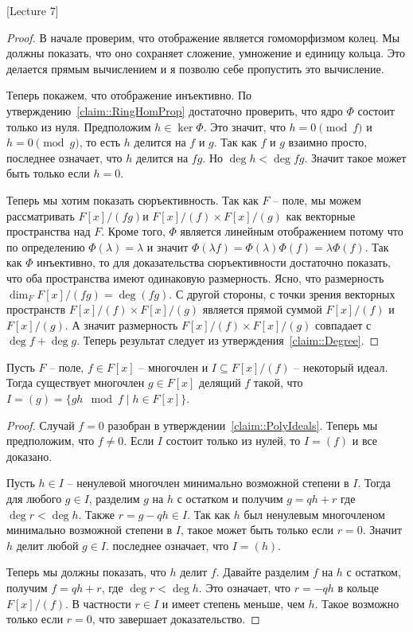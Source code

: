 [Lecture 7]


\begin{proof}
В начале проверим, что отображение является гомоморфизмом колец.
Мы должны показать, что оно сохраняет сложение, умножение и единицу кольца.
Это делается прямым вычислением и я позволю себе пропустить это вычисление.

Теперь покажем, что отображение инъективно.
По утверждению~\ref{claim::RingHomProp} достаточно проверить, что ядро $\Phi$ состоит только из нуля.
Предположим $h\in \ker \Phi$.
Это значит, что $h = 0 \pmod f$ и $h = 0 \pmod g$, то есть $h$ делится на $f$ и $g$.
Так как $f$ и $g$ взаимно просто, последнее означает, что $h$ делится на $fg$.
Но $\deg h < \deg fg$.
Значит такое может быть только если $h = 0$.

Теперь мы хотим показать сюръективность.
Так как $F$ -- поле, мы можем рассматривать $F[x]/(fg)$и $F[x]/(f)\times F[x]/(g)$ как векторные пространства над $F$.
Кроме того, $\Phi$ является линейным отображением потому что по определению $\Phi(\lambda) = \lambda$ и значит $\Phi(\lambda f) = \Phi(\lambda)\Phi(f) = \lambda \Phi(f)$.
Так как $\Phi$ инъективно, то для доказательства сюръективности достаточно показать, что оба пространства имеют одинаковую размерность.
Ясно, что размерность $\dim_F F[x]/(fg) = \deg(fg)$.
С другой стороны, с точки зрения векторных пространств $F[x]/(f)\times F[x]/(g)$ является прямой суммой $F[x]/(f)$ и $F[x]/(g)$.
А значит размерность $F[x]/(f)\times F[x]/(g)$ совпадает с $\deg f + \deg g$.
Теперь результат следует из утверждения~\ref{claim::Degree}.
\end{proof}

\begin{claim}
\label{claim::PolyRemIdeals}
Пусть $F$ -- поле, $f\in F[x]$ -- многочлен и $I\subseteq F[x]/ (f)$ -- некоторый идеал.
Тогда существует многочлен $g\in F[x]$ делящий $f$ такой, что $I = (g) = \{g h\!\!\mod{f}\mid h\in F[x]\}$.
\end{claim}
\begin{proof}
Случай $f = 0$ разобран в утверждении~\ref{claim::PolyIdeals}.
Теперь мы предположим, что $f \neq 0$.
Если $I$ состоит только из нулей, то $I = (f)$ и все доказано.

Пусть $h\in I$ -- ненулевой многочлен минимально возможной степени в $I$.
Тогда для любого $g\in I$, разделим $g$ на $h$ с остатком и получим $g = qh + r$ где $\deg r < \deg h$.
Также $r = g - qh\in I$.
Так как $h$ был ненулевым многочленом минимально возможной степени в $I$, такое может быть только если $r = 0$.
Значит $h$ делит любой $g\in I$.
последнее означает, что $I = (h)$.

Теперь мы должны показать, что $h$ делит $f$.
Давайте разделим $f$ на $h$ с остатком, получим $f = qh + r$, где $\deg r < \deg h$.
Это означает, что $r = -qh$ в кольце $F[x]/(f)$.
В частности $r\in I$ и имеет степень меньше, чем $h$.
Такое возможно только если $r = 0$, что завершает доказательство.
\end{proof}

